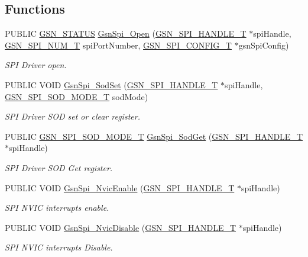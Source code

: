 \subsection*{Functions}
\begin{DoxyCompactItemize}
\item 
PUBLIC \hyperlink{a00660_gada5951904ac6110b1fa95e51a9ddc217}{GSN\_\-STATUS} \hyperlink{a00655_ga9ed2952f398bcf1b2f3a44dec07ebf9e}{GsnSpi\_\-Open} (\hyperlink{a00238}{GSN\_\-SPI\_\-HANDLE\_\-T} $\ast$spiHandle, \hyperlink{a00587_a8158d263babcdfe1b3b113e23acd1bf7}{GSN\_\-SPI\_\-NUM\_\-T} spiPortNumber, \hyperlink{a00231}{GSN\_\-SPI\_\-CONFIG\_\-T} $\ast$gsnSpiConfig)
\begin{DoxyCompactList}\small\item\em SPI Driver open. \end{DoxyCompactList}\item 
PUBLIC VOID \hyperlink{a00655_ga36cba59711e5606473d08c3b2cb119f9}{GsnSpi\_\-SodSet} (\hyperlink{a00238}{GSN\_\-SPI\_\-HANDLE\_\-T} $\ast$spiHandle, \hyperlink{a00655_ga5662413f1ff6b81e835e7c5412916d4b}{GSN\_\-SPI\_\-SOD\_\-MODE\_\-T} sodMode)
\begin{DoxyCompactList}\small\item\em SPI Driver SOD set or clear register. \end{DoxyCompactList}\item 
PUBLIC \hyperlink{a00655_ga5662413f1ff6b81e835e7c5412916d4b}{GSN\_\-SPI\_\-SOD\_\-MODE\_\-T} \hyperlink{a00655_ga2c5d3196d92b29538c2ea7e1c04e8da8}{GsnSpi\_\-SodGet} (\hyperlink{a00238}{GSN\_\-SPI\_\-HANDLE\_\-T} $\ast$spiHandle)
\begin{DoxyCompactList}\small\item\em SPI Driver SOD Get register. \end{DoxyCompactList}\item 
PUBLIC VOID \hyperlink{a00655_ga21713867f6f066789a632fcd2180f691}{GsnSpi\_\-NvicEnable} (\hyperlink{a00238}{GSN\_\-SPI\_\-HANDLE\_\-T} $\ast$spiHandle)
\begin{DoxyCompactList}\small\item\em SPI NVIC interrupts enable. \end{DoxyCompactList}\item 
PUBLIC VOID \hyperlink{a00655_ga979f498b435e07948e147f852955d792}{GsnSpi\_\-NvicDisable} (\hyperlink{a00238}{GSN\_\-SPI\_\-HANDLE\_\-T} $\ast$spiHandle)
\begin{DoxyCompactList}\small\item\em SPI NVIC interrupts Disable. \end{DoxyCompactList}\item 

\end{DoxyCompactItemize}
